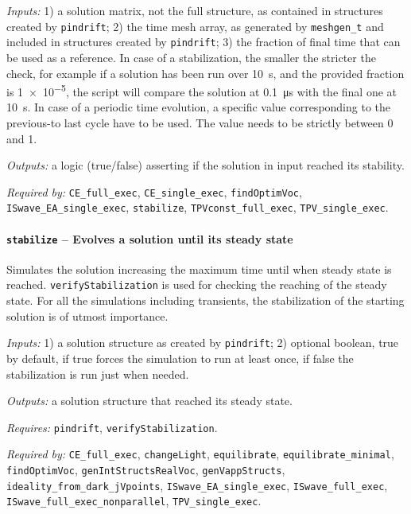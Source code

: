 \textit{Inputs:} 1) a solution matrix, not the full structure, as contained in
     structures created by \texttt{pindrift};
   2) the time mesh array, as generated by \texttt{meshgen\_t} and included
     in structures created by \texttt{pindrift};
   3) the fraction of final time that can be used as a
     reference. In case of a stabilization, the smaller the stricter the
     check, for example if a solution has been run over \SI{10}{\s}, and the provided fraction is \num{1e-5}, the script will compare the solution at \SI{0.1}{\us} with the final one at \SI{10}{\s}. In case of a periodic time evolution, a specific value
     corresponding to the previous-to last cycle have to be used. The
     value needs to be strictly between 0 and 1.

\textit{Outputs:} a logic (true/false) asserting if the solution in input reached its stability.


\textit{Required by:} \texttt{CE\_full\_exec}, \texttt{CE\_single\_exec}, \texttt{find\-Optim\-Voc}, \texttt{ISwave\_EA\_single\_exec}, \texttt{stabilize}, \texttt{TPVconst\_full\_exec}, \texttt{TPV\_single\_exec}.

		\paragraph{\texttt{stabilize} -- Evolves a solution until its steady state}
Simulates the solution increasing the maximum time until when steady state is reached. 
\texttt{verify\-Stabilization} is used for checking the reaching of the steady state.
For all the simulations including transients, the stabilization of the starting solution is of utmost importance.

\textit{Inputs:} 1) a solution structure as created by \texttt{pindrift};
   2) optional boolean, true by default, 
     if true forces the simulation to run at least once, if false the
     stabilization is run just when needed.
     
\textit{Outputs:} a solution structure that reached its steady state.

\textit{Requires:} \texttt{pindrift}, \texttt{verify\-Stabilization}.

\textit{Required by:} \texttt{CE\_full\_exec}, \texttt{change\-Light}, \texttt{equilibrate}, \texttt{equilibrate\_minimal}, \texttt{find\-Optim\-Voc}, \texttt{gen\-Int\-Structs\-Real\-Voc}, \texttt{gen\-Vapp\-Structs}, \texttt{ideality\_from\_dark\_jVpoints}, \texttt{ISwave\_EA\_single\_exec}, \texttt{ISwave\_full\_exec}, \texttt{ISwave\_full\_exec\_nonparallel}, \texttt{TPV\_single\_exec}.

